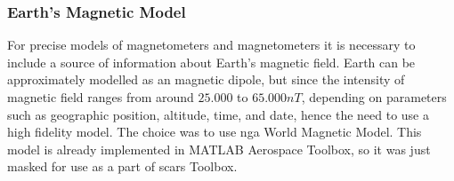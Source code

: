     \subsubsection{Earth's Magnetic Model}
        For precise models of magnetometers and magnetometers it is necessary to include a source of information about Earth's magnetic field. Earth can be approximately modelled as an magnetic dipole, but since the intensity of magnetic field ranges from around $25.000$ to $65.000 nT$, depending on parameters such as geographic position, altitude, time, and date, hence the need to use a high fidelity model. The choice was to use \ac{nga} World Magnetic Model. This model is already implemented in MATLAB Aerospace Toolbox, so it was just masked for use as a part of \ac{scars} Toolbox.
 
